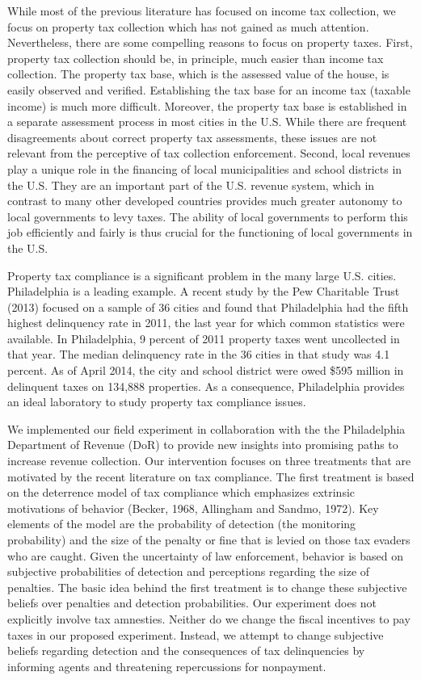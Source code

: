 \documentclass[12pt,titlepage]{article}
\begin{document}
While most of the previous literature has focused on income tax
collection, we focus on property tax collection which has not gained
as much attention. Nevertheless, there are some compelling reasons to
focus on property taxes.  First, property tax collection should be,
in principle, much easier than income tax collection. The property tax
base, which is the assessed value of the house, is easily observed and
verified. Establishing the tax base for an income tax (taxable income)
is much more difficult. Moreover, the property tax base is established
in a separate assessment process in most cities in the U.S. While
there are frequent disagreements about correct property tax
assessments, these issues are not relevant from the perceptive of tax
collection enforcement. Second, local revenues play a unique role in
the financing of local municipalities and school districts in the U.S. They are
an important part of the U.S. revenue system, which in contrast to
many other developed countries provides much greater autonomy to
local governments to levy taxes. The ability of local
governments to perform this job efficiently and fairly is thus crucial
for the functioning of local governments in the U.S.

Property tax compliance is a significant problem in the many
large U.S. cities. Philadelphia is a leading example.  A recent study by the
Pew Charitable Trust (2013) focused on a sample of 36 cities and found
that Philadelphia had the fifth highest delinquency rate in 2011, the
last year for which common statistics were available. In Philadelphia,
9 percent of 2011 property taxes went uncollected in that year. The
median delinquency rate in the 36 cities in that study was 4.1
percent.  As of April 2014, the city and school district were owed
\$595 million in delinquent taxes on 134,888 properties.  As a
consequence, Philadelphia provides an ideal laboratory to study
property tax compliance issues.

We implemented our field experiment in collaboration with the the Philadelphia Department of Revenue (DoR)
to provide new insights into promising paths to increase revenue collection. Our intervention
focuses on three treatments that are motivated by the recent literature on tax
compliance.  The first treatment is based on the deterrence model of
tax compliance which emphasizes extrinsic motivations of behavior
(Becker, 1968, Allingham and Sandmo, 1972). Key elements of the model are the
probability of detection (the monitoring probability) and the size of
the penalty or fine that is levied on those tax evaders who are
caught. Given the uncertainty of law enforcement, behavior is based on
subjective probabilities of detection and perceptions regarding the
size of penalties. The basic idea behind the first treatment is to change
these subjective beliefs over penalties and detection probabilities. Our 
experiment does not explicitly involve tax amnesties. Neither do we change the fiscal incentives to
pay taxes in our proposed experiment. Instead, we attempt to change
subjective beliefs regarding detection and the consequences of tax
delinquencies by informing agents and threatening repercussions for nonpayment.
\end{document}
